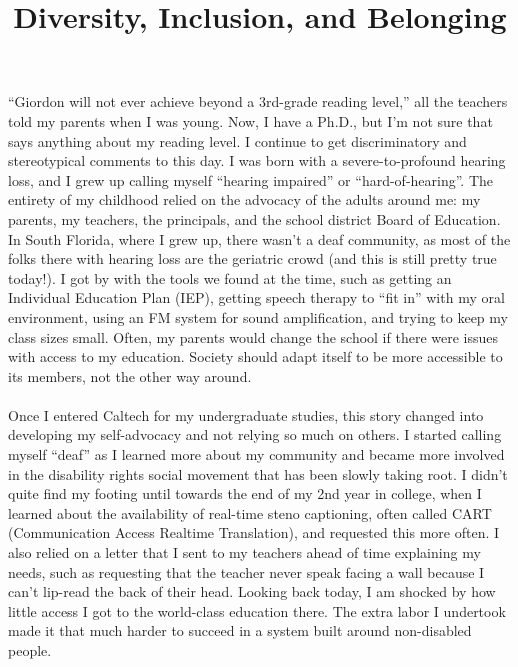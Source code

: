 \documentclass[10pt,a4paper,sans]{moderncv} %
\title{Diversity, Inclusion, and Belonging}
\begin{document}
\renewcommand*{\bibliographyhead}[1]{\section{#1}}
\makecvtitle %
\vspace*{-2em}

``Giordon will not ever achieve beyond a 3rd-grade reading level,'' all the teachers told my parents when I was young. Now, I have a Ph.D., but I'm not sure that says anything about my reading level. I continue to get discriminatory and stereotypical comments to this day. I was born with a severe-to-profound hearing loss, and I grew up calling myself ``hearing impaired'' or ``hard-of-hearing''. The entirety of my childhood relied on the advocacy of the adults around me: my parents, my teachers, the principals, and the school district Board of Education. In South Florida, where I grew up, there wasn't a deaf community, as most of the folks there with hearing loss are the geriatric crowd (and this is still pretty true today!). I got by with the tools we found at the time, such as getting an Individual Education Plan (IEP), getting speech therapy to ``fit in'' with my oral environment, using an FM system for sound amplification, and trying to keep my class sizes small. Often, my parents would change the school if there were issues with access to my education. Society should adapt itself to be more accessible to its members, not the other way around.
\\
\\
Once I entered Caltech for my undergraduate studies, this story changed into developing my self-advocacy and not relying so much on others. I started calling myself ``deaf'' as I learned more about my community and became more involved in the disability rights social movement that has been slowly taking root. I didn't quite find my footing until towards the end of my 2nd year in college, when I learned about the availability of real-time steno captioning, often called CART (Communication Access Realtime Translation), and requested this more often. I also relied on a letter that I sent to my teachers ahead of time explaining my needs, such as requesting that the teacher never speak facing a wall because I can't lip-read the back of their head. Looking back today, I am shocked by how little access I got to the world-class education there. The extra labor I undertook made it that much harder to succeed in a system built around non-disabled people.
\\
\end{document}
